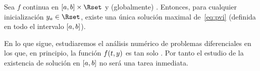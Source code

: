 \begin{proposition}
  \label{thm:existencia-unif-lipschitz}
  Sea $f$ continua en $[\ta,\tb]\times\Rset$ y (globalmente) \globLipschitz.
  Entonces, para cualquier inicialización $\ycero\in\Rset$, existe una
  única solución maximal de~\eqref{eq:pvi} (definida en todo el
  intervalo $[\ta,\tb]$).%
\end{proposition}


En lo que sigue, estudiaremos el análisis numérico de problemas
diferenciales en los que, en principio, la función $f(\tt,y)$ es tan
solo \locLipschitz. Por tanto el estudio de la existencia de solución
en $[\ta,\tb]$ no será una tarea inmediata. %



